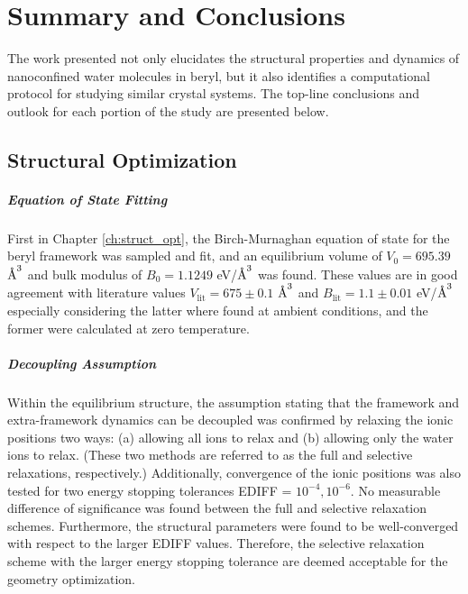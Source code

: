 
\chapter{Summary and Conclusions}
\label{chap:conclusions}


The work presented not only elucidates the structural properties and dynamics of nanoconfined water molecules in beryl, but it also identifies a computational protocol for studying similar crystal systems. The top-line conclusions and outlook for each portion of the study are presented below.

\section{Structural Optimization} 

\paragraph{Equation of State Fitting} First in Chapter \ref{ch:struct_opt}, the Birch-Murnaghan equation of state for the beryl framework was sampled and fit, and an equilibrium volume of $V_0= 695.39$ $\text{\normalfont\AA}^3$ and bulk modulus of $B_0 = 1.1249$ eV/$\text{\normalfont\AA}^3$ was found. These values are in good agreement with literature values \textemdash  $V_\text{lit} = 675\pm0.1$ $\text{\normalfont\AA}^3$ and $B_\text{lit} = 1.1\pm0.01$ eV/$\text{\normalfont\AA}^3$ \textemdash especially considering the latter where found at ambient conditions, and the former were calculated at zero temperature. 

\paragraph{Decoupling Assumption} Within the equilibrium structure, the assumption stating that the framework and extra-framework dynamics can be decoupled was confirmed by relaxing the ionic positions two ways: (a) allowing all ions to relax and (b) allowing only the water ions to relax. (These two methods are referred to as the full and selective relaxations, respectively.) Additionally, convergence of the ionic positions was also tested for two energy stopping tolerances EDIFF = $10^{-4},10^{-6}$. No measurable difference of significance was found between the full and selective relaxation schemes. Furthermore, the structural parameters were found to be well-converged with respect to the larger EDIFF values. Therefore, the selective relaxation scheme with the larger energy stopping tolerance are deemed acceptable for the geometry optimization.

